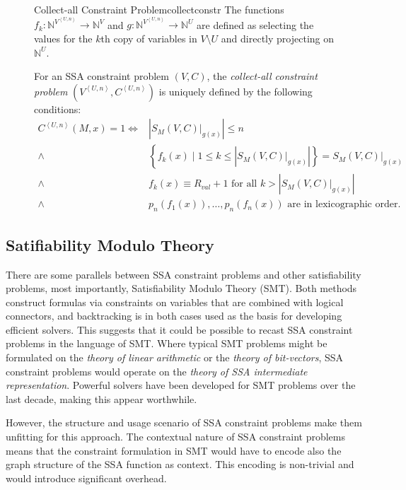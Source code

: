 \begin{figure}[p]
\begin{definition}{Collect-all Constraint Problem}{collectconstr}
        The functions
        $f_k\colon\mathbb N^{V^{\left<U,n\right>}}\rightarrow\mathbb N^V$ and
        $g\colon\mathbb N^{V^{\left<U,n\right>}}\rightarrow\mathbb N^U$ are
        defined as selecting the values for the $k$th copy of
        variables in $V\setminus U$ and directly projecting on $\mathbb N^U$.

        For an SSA constraint problem $(V,C)$, the
        {\em collect-all constraint problem}
        $(V^{\left<U,n\right>}, C^{\left<U,n\right>})$ is uniquely defined by
        the following conditions:
        \begin{align*}
            C^{\left<U,n\right>}(M,x)=1\iff{}&\left|S_M(V,C)|_{g(x)}\right|\leq n\\[-0.73mm]
                              \mathrel\land{}&\left\{f_k(x)\mid 1\leq k\leq\left|S_M(V,C)|_{g(x)}\right|\right\} = S_M(V,C)|_{g(x)}\\[-0.73mm]
                              \mathrel\land{}&f_k(x)\equiv R_{val}+1\text{ for all }k>\left|S_M(V,C)|_{g(x)}\right|\\[-0.73mm]
                              \mathrel\land{}&p_n(f_1(x)),\dots,p_n(f_n(x))\text{ are in lexicographic order}.
        \end{align*}
    \end{definition}
\end{figure}

\subsection{Satifiability Modulo Theory}
\label{sec:SATcomp}

    There are some parallels between SSA constraint problems and other
    satisfiability problems, most importantly, Satisfiability Modulo Theory
    (SMT).
    Both methods construct formulas via constraints on variables that are
    combined with logical connectors, and backtracking is in both cases used as
    the basis for developing efficient solvers.
    This suggests that it could be possible to recast SSA constraint problems in
    the language of SMT.
    Where typical SMT problems might be formulated on the
    {\em theory of linear arithmetic} or the {\em theory of bit-vectors},
    SSA constraint problems would operate on the
    {\em theory of SSA intermediate representation}.
    Powerful solvers have been developed for SMT problems over the last decade,
    making this appear worthwhile.

    However, the structure and usage scenario of SSA constraint problems make
    them unfitting for this approach.
    The contextual nature of SSA constraint problems means that the constraint
    formulation in SMT would have to encode also the graph structure of the
    SSA function as context.
    This encoding is non-trivial and would introduce significant overhead.

